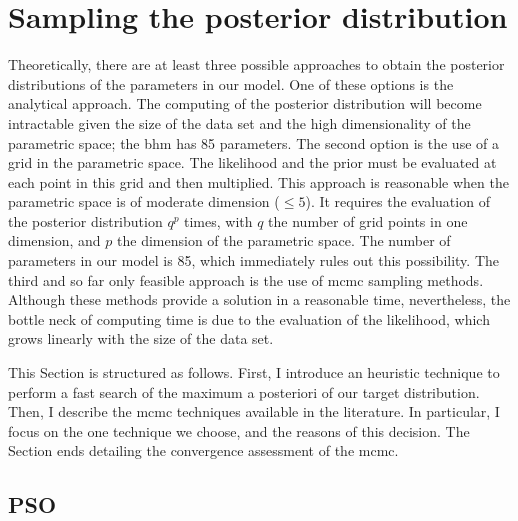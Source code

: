 \section{Sampling the posterior distribution}

Theoretically, there are at least three possible approaches to obtain the posterior distributions of the parameters in our model. One of these options is the analytical approach. {The computing of the posterior distribution will become intractable given the size of the data set and the high dimensionality of the parametric space; the \gls{bhm} has 85 parameters}. The second option is the use of a grid in the parametric space. The likelihood and the prior must be evaluated at each point in this grid and then multiplied. This approach is reasonable when the parametric space is of moderate dimension ($\leq 5$). It requires the evaluation of the posterior distribution $q^p$ times, with $q$ the number of grid points in one dimension, and $p$ the dimension of the parametric space. The number of parameters in our model is 85, which immediately rules out this possibility. The third and so far only feasible approach is the use of \gls{mcmc} sampling methods. Although these methods provide a solution in a reasonable time, nevertheless, the bottle neck of computing time is due to the evaluation of the likelihood, which grows linearly with the size of the data set. 

This Section is structured as follows. First, I introduce an heuristic technique to perform a fast search of the maximum a posteriori of our target distribution. Then, I describe the \gls{mcmc} techniques available in the literature.{ In particular, I focus on the one technique we choose, and the reasons of this decision}. The Section ends detailing the convergence assessment of the \gls{mcmc}.

\subsection{PSO}

